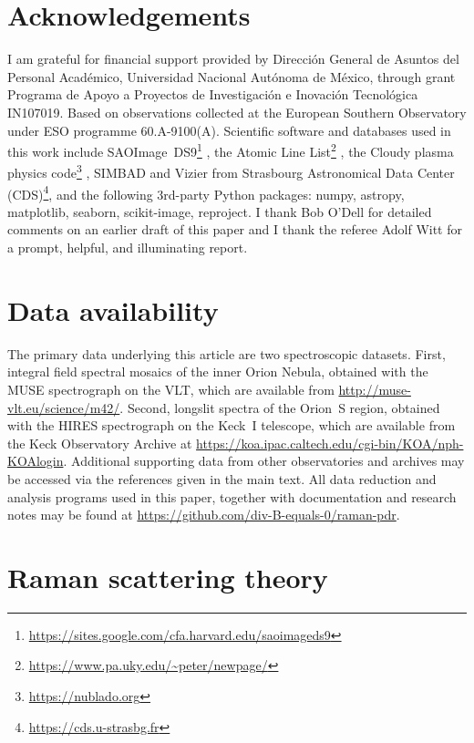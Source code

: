 \documentclass[useAMS, usenatbib, a4paper]{mnras}
\begin{document}
\section*{Acknowledgements}
I am grateful for financial support provided by
\foreignlanguage{spanish}{
  Dirección General de Asuntos del Personal Académico,
  Universidad Nacional Autónoma de México},
through grant
\foreignlanguage{spanish}{
  Programa de Apoyo a Proyectos de Investigación
  e Inovación Tecnológica}
IN107019.
Based on observations collected at the European Southern Observatory
under ESO programme 60.A-9100(A).
Scientific software and databases used in this work include
SAOImage~DS9\footnote{\url{https://sites.google.com/cfa.harvard.edu/saoimageds9}} \citep{Joye:2003a},
the Atomic Line List\footnote{\url{https://www.pa.uky.edu/~peter/newpage/}} \citep{Van-Hoof:2018a},
the Cloudy plasma physics code\footnote{\url{https://nublado.org}}
\citep{Ferland:2017a},
SIMBAD and Vizier from Strasbourg Astronomical Data Center (CDS)\footnote{\url{https://cds.u-strasbg.fr}},
and the following 3rd-party Python packages:
numpy, astropy, matplotlib, seaborn, scikit-image, reproject.
I thank Bob O'Dell for detailed comments on an earlier draft of this paper
and I thank the referee Adolf Witt for a prompt, helpful, and illuminating report.


\section*{Data availability}
\label{sec:data-availability}

The primary data underlying this article are two spectroscopic datasets.
First, integral field spectral mosaics of the inner Orion Nebula,
obtained with the MUSE spectrograph on the VLT,
which are available from \url{http://muse-vlt.eu/science/m42/}.
Second, longslit spectra of the Orion~S region,
obtained with the HIRES spectrograph on the Keck~I telescope,
which are available from the Keck Observatory Archive at
\url{https://koa.ipac.caltech.edu/cgi-bin/KOA/nph-KOAlogin}.
Additional supporting data from other observatories and archives
may be accessed via the references given in the main text.
All data reduction and analysis programs used in this paper,
together with documentation and research notes may be found at
\url{https://github.com/div-B-equals-0/raman-pdr}.



\appendix

\section{Raman scattering theory}
\label{sec:raman-theory}
\end{document}
